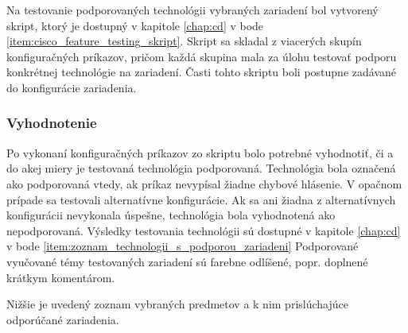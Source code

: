 Na testovanie podporovaných technológii vybraných zariadení bol vytvorený skript, ktorý je dostupný v kapitole \ref{chap:cd} v bode \ref{item:cisco_feature_testing_skript}. Skript sa skladal z viacerých skupín konfiguračných príkazov, pričom každá skupina mala za úlohu testovať podporu konkrétnej technológie na zariadení. Časti tohto skriptu boli postupne zadávané do konfigurácie zariadenia.




\subsubsection{Vyhodnotenie}
\label{chap:testovanie_technologii_vyhodnotenie}

Po vykonaní konfiguračných príkazov zo skriptu bolo potrebné vyhodnotiť, či a do akej miery je testovaná technológia podporovaná. Technológia bola označená ako podporovaná vtedy, ak príkaz nevypísal žiadne chybové hlásenie. V opačnom prípade sa testovali alternatívne konfigurácie. Ak sa ani žiadna z alternatívnych konfigurácii nevykonala úspešne, technológia bola vyhodnotená ako nepodporovaná. Výsledky testovania technológii sú dostupné v kapitole \ref{chap:cd} v bode \ref{item:zoznam_technologii_s_podporou_zariadeni} Podporované vyučované témy testovaných zariadení sú farebne odlíšené, popr. doplnené krátkym komentárom.

Nižšie je uvedený zoznam vybraných predmetov a k nim prislúchajúce odporúčané zariadenia.

